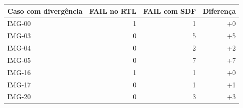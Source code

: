 \begin{tabular}{lrrr}
\toprule\textbf{Caso com divergência} & \textbf{FAIL no RTL} & \textbf{FAIL com SDF} & \textbf{Diferença}\\\midrule
IMG-00 & 1 & 1 & +0\\
IMG-03 & 0 & 5 & +5\\
IMG-04 & 0 & 2 & +2\\
IMG-05 & 0 & 7 & +7\\
IMG-16 & 1 & 1 & +0\\
IMG-17 & 0 & 1 & +1\\
IMG-20 & 0 & 3 & +3\\
\bottomrule\end{tabular}
